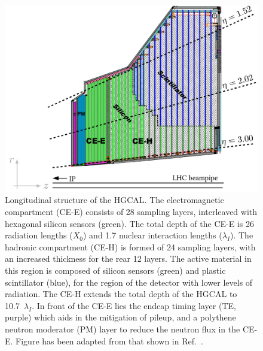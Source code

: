 \begin{figure}[htb!]
  \centering
  \includegraphics[width=1\textwidth]{Figures/cms/hgcal.pdf}
  \caption[Longitudinal structure of the High-Granularity Calorimeter]
  {
    Longitudinal structure of the HGCAL. The electromagnetic compartment (CE-E) consists of 28 sampling layers, interleaved with hexagonal silicon sensors (green). The total depth of the CE-E is 26 radiation lengths ($X_0$) and 1.7 nuclear interaction lengths ($\lambda_I$). The hadronic compartment (CE-H) is formed of 24 sampling layers, with an increased thickness for the rear 12 layers. The active material in this region is composed of silicon sensors (green) and plastic scintillator (blue), for the region of the detector with lower levels of radiation. The CE-H extends the total depth of the HGCAL to 10.7~$\lambda_I$. In front of the CE-E lies the endcap timing layer (TE, purple) which aids in the mitigation of pileup, and a polythene neutron moderator (PM) layer to reduce the neutron flux in the CE-E. Figure has been adapted from that shown in Ref.~\cite{CERN-LHCC-2017-023}.
  }
  \label{fig:cms_hgcal}
\end{figure}

